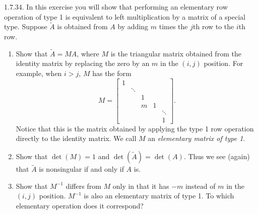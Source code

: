 \documentclass{report}
\begin{document}
    \bigbreak \noindent 
    \begin{mdframed}
        1.7.34.  In this exercise you will show that performing an elementary row operation of type 1 is equivalent to left multiplication by a matrix of a special type. Suppose $\tilde{A}$ is obtained from $A$ by adding $m$ times the $j$th row to the $i$th row.

        \begin{enumerate}[label=(\alph*)]
            \item Show that $\tilde{A} = M A$, where $M$ is the triangular matrix obtained 
                from the identity matrix by replacing the zero by an $m$ in the $(i,j)$ position. 
                For example, when $i > j$, $M$ has the form
                \[
                    M = \begin{bmatrix}
                        1 &        &        &        &   \\
                          & \ddots &        &        &   \\
                          &        & 1      &        &   \\
                          &        & m      & 1      &   \\
                          &        &        &        & \ddots \\
                          &        &        &        &        1
                    \end{bmatrix}.
                \]
                Notice that this is the matrix obtained by applying the type 1 row operation 
                directly to the identity matrix. We call $M$ an \textit{elementary matrix of type 1}.

            \item Show that $\det(M) = 1$ and $\det(\tilde{A}) = \det(A)$. 
                Thus we see (again) that $\tilde{A}$ is nonsingular if and only if $A$ is.

            \item Show that $M^{-1}$ differs from $M$ only in that it has $-m$ instead of $m$ 
                in the $(i,j)$ position. $M^{-1}$ is also an elementary matrix of type 1. 
                To which elementary operation does it correspond?
        \end{enumerate}
    \end{mdframed}
\end{document}
